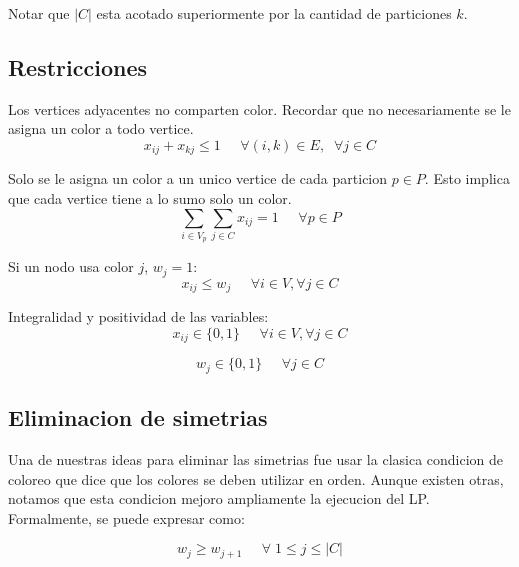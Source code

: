 Notar que $|C|$ esta acotado superiormente por la cantidad de particiones $k$.

\vspace{10px}

\subsection{Restricciones}
\label{restricciones}

Los vertices adyacentes no comparten color. Recordar que no necesariamente se le asigna un color a todo vertice.
\begin{equation}
x_{ij} + x_{kj} \leq 1 \;\;\;\;\; \forall (i,k) \in E,\;\; \forall j \in C
\end{equation}

Solo se le asigna un color a un unico vertice de cada particion $p \in P$. Esto implica que cada vertice tiene a lo sumo solo un color.
\begin{equation}
\sum_{i \in V_p} \sum_{j \in C} x_{ij} = 1 \;\;\;\;\; \forall p \in P
\end{equation}

Si un nodo usa color $j$, $w_j = 1$:
\begin{equation}
x_{ij} \leq w_j \;\;\;\;\; \forall i \in V, \forall j \in C
\end{equation}

Integralidad y positividad de las variables:
\begin{equation}
x_{ij} \in \{0,1\} \;\;\;\;\; \forall i \in V, \forall j \in C
\end{equation}

\begin{equation}
w_j \in \{0,1\} \;\;\;\;\; \forall j \in C
\end{equation}

\subsection{Eliminacion de simetrias}

Una de nuestras ideas para eliminar las simetrias fue usar la clasica condicion de coloreo que dice que los colores se deben utilizar en orden. Aunque existen otras, notamos que esta condicion mejoro ampliamente la ejecucion del LP. Formalmente, se puede expresar como:

\begin{equation}
w_j \geq w_{j+1} \;\;\;\;\; \forall \; 1 \leq j \leq |C|
\end{equation}